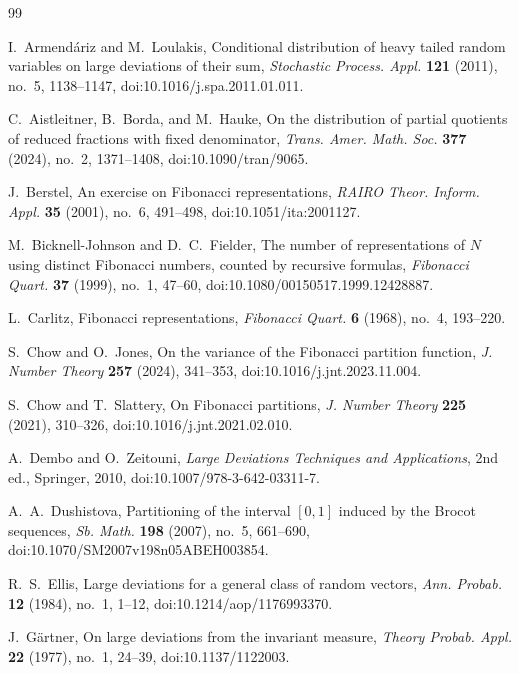 \begin{thebibliography}{99}

I.~Armend\'ariz and M.~Loulakis,
Conditional distribution of heavy tailed random variables on large
deviations of their sum,
\textit{Stochastic Process. Appl.} \textbf{121} (2011), no.~5, 1138--1147,
doi:10.1016/j.spa.2011.01.011.

C.~Aistleitner, B.~Borda, and M.~Hauke,
On the distribution of partial quotients of reduced fractions with fixed
denominator,
\textit{Trans. Amer. Math. Soc.} \textbf{377} (2024), no.~2, 1371--1408,
doi:10.1090/tran/9065.

J.~Berstel,
An exercise on Fibonacci representations,
\textit{RAIRO Theor. Inform. Appl.} \textbf{35} (2001), no.~6, 491--498,
doi:10.1051/ita:2001127.

M.~Bicknell-Johnson and D.~C.~Fielder,
The number of representations of \(N\) using distinct Fibonacci numbers,
counted by recursive formulas,
\textit{Fibonacci Quart.} \textbf{37} (1999), no.~1, 47--60,
doi:10.1080/00150517.1999.12428887.

L.~Carlitz,
Fibonacci representations,
\textit{Fibonacci Quart.} \textbf{6} (1968), no.~4, 193--220.

S.~Chow and O.~Jones,
On the variance of the Fibonacci partition function,
\textit{J. Number Theory} \textbf{257} (2024), 341--353,
doi:10.1016/j.jnt.2023.11.004.

S.~Chow and T.~Slattery,
On Fibonacci partitions,
\textit{J. Number Theory} \textbf{225} (2021), 310--326,
doi:10.1016/j.jnt.2021.02.010.

A.~Dembo and O.~Zeitouni,
\textit{Large Deviations Techniques and Applications},
2nd ed., Springer, 2010,
doi:10.1007/978-3-642-03311-7.

A.~A.~Dushistova,
Partitioning of the interval \([0,1]\) induced by the Brocot sequences,
\textit{Sb. Math.} \textbf{198} (2007), no.~5, 661--690,
doi:10.1070/SM2007v198n05ABEH003854.

R.~S.~Ellis,
Large deviations for a general class of random vectors,
\textit{Ann. Probab.} \textbf{12} (1984), no.~1, 1--12,
doi:10.1214/aop/1176993370.

J.~G\"artner,
On large deviations from the invariant measure,
\textit{Theory Probab. Appl.} \textbf{22} (1977), no.~1, 24--39,
doi:10.1137/1122003.


\end{thebibliography}
